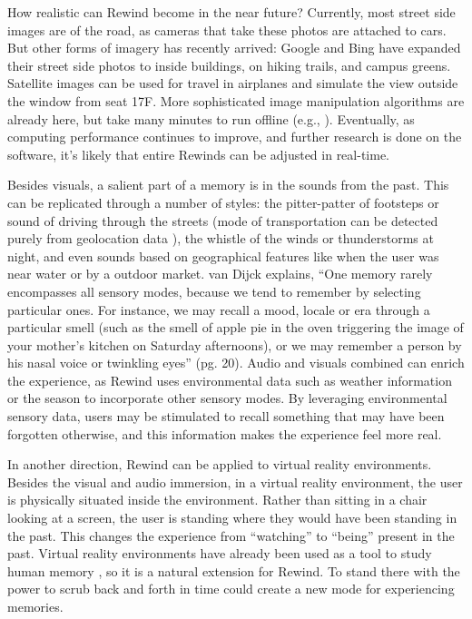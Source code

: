 \documentclass{sigchi}
\begin{document}
How realistic can Rewind become in the near future? Currently, most street side images are of the road, as cameras that take these photos are attached to cars. But other forms of imagery has recently arrived: Google and Bing have expanded their street side photos to inside buildings, on hiking trails, and campus greens. Satellite images can be used for travel in airplanes and simulate the view outside the window from seat 17F. More sophisticated image manipulation algorithms are already here, but take many minutes to run offline (e.g., \cite{laffont2014transient,shih2013data}). Eventually, as computing performance continues to improve, and further research is done on the software, it's likely that entire Rewinds can be adjusted in real-time.

Besides visuals, a salient part of a memory is in the sounds from the past. This can be replicated through a number of styles: the pitter-patter of footsteps or sound of driving through the streets (mode of transportation can be detected purely from geolocation data \cite{zheng2008learning}), the whistle of the winds or thunderstorms at night, and even sounds based on geographical features like when the user was near water or by a outdoor market. van Dijck explains, ``One memory rarely encompasses all sensory modes, because we tend to remember by selecting particular ones. For instance, we may recall a mood, locale or era through a particular smell (such as the smell of apple pie in the oven triggering the image of your mother's kitchen on Saturday afternoons), or we may remember a person by his nasal voice or twinkling eyes'' \cite{van2007mediated} (pg. 20). Audio and visuals combined can enrich the experience, as Rewind uses environmental data such as weather information or the season to incorporate other sensory modes. By leveraging environmental sensory data, users may be stimulated to recall something that may have been forgotten otherwise, and this information makes the experience feel more real.

In another direction, Rewind can be applied to virtual reality environments. Besides the visual and audio immersion, in a virtual reality environment, the user is physically situated inside the environment. Rather than sitting in a chair looking at a screen, the user is standing where they would have been standing in the past. This changes the experience from ``watching'' to ``being'' present in the past. Virtual reality environments have already been used as a tool to study human memory \cite{gamberini2000virtual}, so it is a natural extension for Rewind. To stand there with the power to scrub back and forth in time could create a new mode for experiencing memories.
\end{document}
